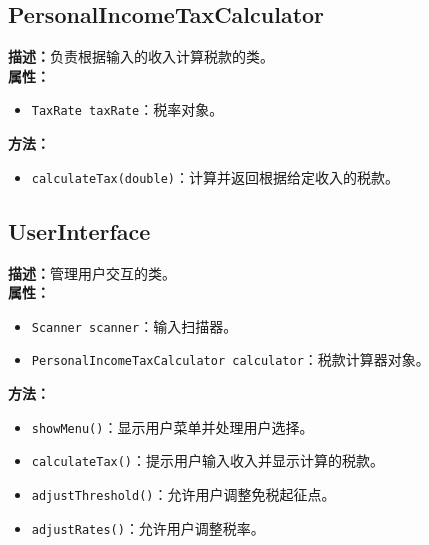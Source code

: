 \documentclass{article}
\begin{document}
\subsection{PersonalIncomeTaxCalculator}
\textbf{描述：}负责根据输入的收入计算税款的类。\\
\textbf{属性：}
\begin{itemize}
    \item \texttt{TaxRate taxRate}：税率对象。
\end{itemize}
\textbf{方法：}
\begin{itemize}
    \item \texttt{calculateTax(double)}：计算并返回根据给定收入的税款。
\end{itemize}

\subsection{UserInterface}
\textbf{描述：}管理用户交互的类。\\
\textbf{属性：}
\begin{itemize}
    \item \texttt{Scanner scanner}：输入扫描器。
    \item \texttt{PersonalIncomeTaxCalculator calculator}：税款计算器对象。
\end{itemize}
\textbf{方法：}
\begin{itemize}
    \item \texttt{showMenu()}：显示用户菜单并处理用户选择。
    \item \texttt{calculateTax()}：提示用户输入收入并显示计算的税款。
    \item \texttt{adjustThreshold()}：允许用户调整免税起征点。
    \item \texttt{adjustRates()}：允许用户调整税率。
\end{itemize}
\end{document}
